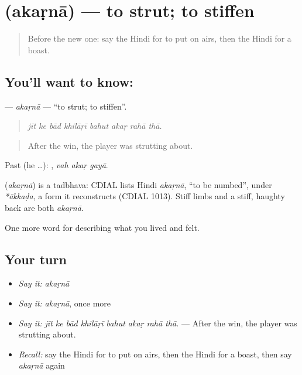 \section[\texorpdfstring{\hi{अकड़ना} (akaṛnā)}{अकड़ना (akaṛnā)}]{ (akaṛnā) — to strut; to stiffen}

\label{lesson:HI-C462-akarna}



\begin{quote}
Before the new one: say the Hindi for to put on airs, then the Hindi for a boast.
\end{quote}

\subsection*{You'll want to know: }
\textbf{} — \emph{akaṛnā} — \textquotedblleft{}to strut; to stiffen\textquotedblright{}.

\begin{quote}
       
\end{quote}

\begin{quote}
\emph{jīt ke bād khilāṛī bahut akaṛ rahā thā.}
\end{quote}

\begin{quote}
After the win, the player was strutting about.
\end{quote}

Past (he …):   , \emph{vah akaṛ gayā}.

\begin{cousinweb}
\textbf{} (\emph{akaṛnā}) is a tadbhava: CDIAL lists Hindi \emph{akaṛnā}, \textquotedblleft{}to be numbed\textquotedblright{}, under \emph{*ākkaḍa}, a form it reconstructs (CDIAL 1013). Stiff limbs and a stiff, haughty back are both \emph{akaṛnā}.
\end{cousinweb}

\begin{grammarlens}[title={What you've built}]
One more word for describing what you lived and felt.
\end{grammarlens}

\subsection*{Your turn}
\begin{itemize}
\raggedright
  \item \emph{Say it:} \emph{akaṛnā}
  \item \emph{Say it:} \emph{akaṛnā}, once more
  \item \emph{Say it:} \emph{jīt ke bād khilāṛī bahut akaṛ rahā thā.} — After the win, the player was strutting about.
  \item \emph{Recall:} say the Hindi for to put on airs, then the Hindi for a boast, then say \emph{akaṛnā} again
\end{itemize}

